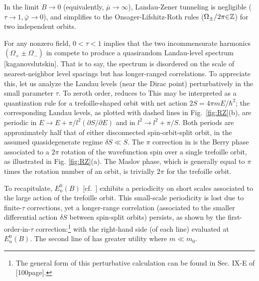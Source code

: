 \documentclass[aps, prb, showpacs, twocolumn, notitlepage, superscriptaddress]{revtex4-1}
\begin{document}
In the limit $B{\rightarrow}0$ (equivalently, $\bar{\mu}{\rightarrow} \infty$), Landau-Zener tunneling is negligible ($\tau{\rightarrow}1,\bar{\varphi}{\rightarrow}0$), and  simplifies to the Onsager-Lifshitz-Roth rules ($\Omega_{\pm}/2\pi{\in}\mathbb{Z}$) for  two independent orbits.

For any nonzero field, $0{<}\tau{<}1$ implies that the two incommensurate harmonics $(\Omega_+{\pm}\Omega_-)$ in  compete to produce a quasirandom Landau-level spectrum [kaganovslutskin]. That is to say, the spectrum is disordered on the scale of nearest-neighbor level spacings but has longer-ranged correlations. To appreciate this, let us analyze the Landau levels (near the Dirac point) perturbatively in the small parameter $\tau$. To zeroth order,  reduces to
 This may be interpreted as a quantization rule for a trefoille-shaped orbit with net action $2S{=}4\pi m E{/\hbar^2}$; the corresponding Landau levels, as plotted with dashed lines in Fig.\ \ref{fig:RZ}(b), are  periodic in $E{\rightarrow}E{+}\pi/l^2(\partial S/\partial E)$ and in $l^2{\rightarrow}l^2{+}\pi/S$. Both periods are approximately half that of either disconnected spin-orbit-split orbit, in the assumed quasidegenerate regime $\delta S{\ll}S$. The $\pi$ correction in  is the Berry phase associated to a $2\pi$ rotation of the wavefunction spin over a single trefoille orbit, as illustrated in Fig. \ref{fig:RZ}(a). The Maslov phase, which is generally equal to $\pi$ times the rotation number of an orbit, is trivially $2\pi$ for the trefoille orbit.




To recapitulate, $E_n^0(B)$ [cf.\ ] exhibits a periodicity on short scales associated to the large action of the trefoille orbit. This small-scale periodicity is lost due to  finite-$\tau$ corrections, yet a longer-range correlation (associated to the smaller differential action $\delta S$ between spin-split orbits) persists, as shown by the first-order-in-$\tau$ correction:\footnote{The general form of this perturbative calculation can be found in Sec. IX-E of [100page]. } 
with the right-hand side (of each line) evaluated at $E_n^0(B)$. The second line of  has greater utility where $m{\ll}m_0$. 
\end{document}
